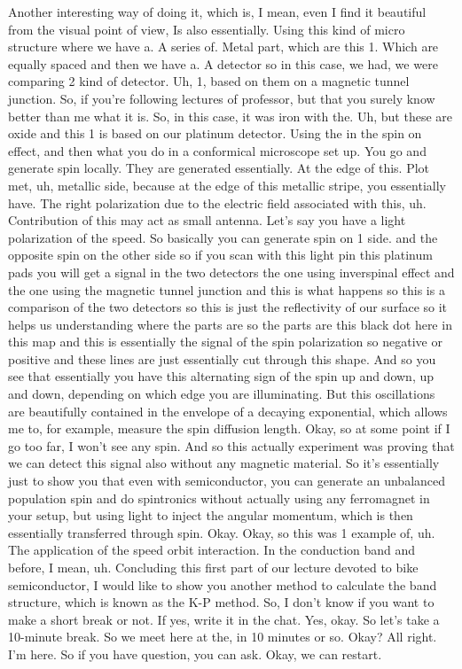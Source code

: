 Another interesting way of doing it, which is, I mean, even I find it beautiful from the visual point of view, Is also essentially. Using this kind of micro structure where we have a. A series of. Metal part, which are this 1. Which are equally spaced and then we have a. A detector so in this case, we had, we were comparing 2 kind of detector. Uh, 1, based on them on a magnetic tunnel junction. So, if you're following lectures of professor, but that you surely know better than me what it is. So, in this case, it was iron with the. Uh, but these are oxide and this 1 is based on our platinum detector. Using the in the spin on effect, and then what you do in a conformical microscope set up. You go and generate spin locally. They are generated essentially. At the edge of this. Plot met, uh, metallic side, because at the edge of this metallic stripe, you essentially have. The right polarization due to the electric field associated with this, uh. Contribution of this may act as small antenna. Let's say you have a light polarization of the speed. So basically you can generate spin on 1 side. and the opposite spin on the other side so if you scan with this light pin this platinum pads you will get a signal in the two detectors the one using inverspinal effect and the one using the magnetic tunnel junction and this is what happens so this is a comparison of the two detectors so this is just the reflectivity of our surface so it helps us understanding where the parts are so the parts are this black dot here in this map and this is essentially the signal of the spin polarization so negative or positive and these lines are just essentially cut through this shape. And so you see that essentially you have this alternating sign of the spin up and down, up and down, depending on which edge you are illuminating. But this oscillations are beautifully contained in the envelope of a decaying exponential, which allows me to, for example, measure the spin diffusion length. Okay, so at some point if I go too far, I won't see any spin. And so this actually experiment was proving that we can detect this signal also without any magnetic material. So it's essentially just to show you that even with semiconductor, you can generate an unbalanced population spin and do spintronics without actually using any ferromagnet in your setup, but using light to inject the angular momentum, which is then essentially transferred through spin. Okay. Okay, so this was 1 example of, uh. The application of the speed orbit interaction. In the conduction band and before, I mean, uh. Concluding this first part of our lecture devoted to bike semiconductor, I would like to show you another method to calculate the band structure, which is known as the K-P method. So, I don't know if you want to make a short break or not. If yes, write it in the chat. Yes, okay. So let's take a 10-minute break. So we meet here at the, in 10 minutes or so. Okay? All right. I'm here. So if you have question, you can ask. Okay, we can restart.

